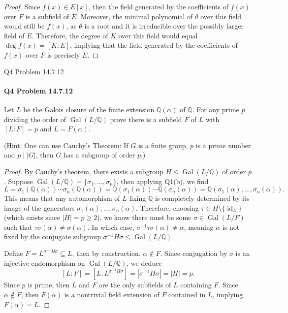 \documentclass[12pt]{article}
\newenvironment{fullbox}{\begin{lrbox}{\savefullbox}\begin{minipage}{\dimexpr\textwidth-2\fboxsep\relax}}{\end{minipage}\end{lrbox}\begin{center}\framebox[\textwidth]{\usebox{\savefullbox}}\end{center}}
\newenvironment{pbox}[1][]{\begin{fullbox}\ifx#1\empty\else\paragraph{#1}\fi}{\end{fullbox}}
\newcommand{\Q}{\mathbb{Q}}
\newcommand{\<}{\langle}
\renewcommand{\>}{\rangle}
\DeclareMathOperator{\id}{id}
\DeclareMathOperator{\Gal}{Gal}
\begin{document}
\begin{proof}
    Since $f(x) \in E[x]$, then the field generated by the coefficients of $f(x)$ over $F$ is a subfield of $E$. Moreover, the minimal polynomial of $\theta$ over this field would still be $f(x)$, as $\theta$ is a root and it is irreducible over the possibly larger field of $E$. Therefore, the degree of $K$ over this field would equal $\deg f(x) = [K : E]$, implying that the field generated by the coefficients of $f(x)$ over $F$ is precisely $E$.

\end{proof}

\newpage
\begin{pbox}[Q4 Problem 14.7.12]
    Let $L$ be the Galois closure of the finite extension $\Q(\alpha)$ of $\Q$. For any prime $p$ dividing the order of $\Gal(L/\Q)$ prove there is a subfield $F$ of $L$ with $[L : F] = p$ and $L = F(\alpha)$.
    
    (Hint: One can use Cauchy's Theorem: If $G$ is a finite group, $p$ is a prime number and $p \mid |G|$, then $G$ has a subgroup of order $p$.)
\end{pbox}

\begin{proof}
    By Cauchy's theorem, there exists a subgroup $H \leq \Gal(L/\Q)$ of order $p$. Suppose $\Gal(L/\Q) = \{\sigma_1, \dots, \sigma_n\}$, then applying Q1(b), we find
    \[
        L
            = \sigma_1(\Q(\alpha)) \cdots \sigma_n(\Q(\alpha))
            = \Q(\sigma_1(\alpha)) \cdots \Q(\sigma_n(\alpha))
            = \Q(\sigma_1(\alpha), \dots, \sigma_n(\alpha)).
    \]
    This means that any automorphism of $L$ fixing $\Q$ is completely determined by its image of the generators $\sigma_1(\alpha), \dots, \sigma_n(\alpha)$. Therefore, choosing $\tau \in H \setminus\{\id_L\}$ (which exists since $|H| = p \geq 2$), we know there must be some $\sigma \in \Gal(L/F)$ such that $\tau\sigma(\alpha) \ne \sigma(\alpha)$. In which case, $\sigma^{-1}\tau\sigma(\alpha) \ne \alpha$, meaning $\alpha$ is not fixed by the conjugate subgroup $\sigma^{-1}H\sigma \leq \Gal(L/\Q)$.
    
    Define $F = L^{\sigma^{-1}H\sigma} \subseteq L$, then by construction, $\alpha \notin F$. Since conjugation by $\sigma$ is an injective endomorphism on $\Gal(L/\Q)$, we deduce
    \[
        [L : F] = [L : L^{\sigma^{-1}H\sigma}] = |\sigma^{-1}H\sigma| = |H| = p.
    \]
    Since $p$ is prime, then $L$ and $F$ are the only subfields of $L$ containing $F$. Since $\alpha \notin F$, then $F(\alpha)$ is a nontrivial field extension of $F$ contained in $L$, implying $F(\alpha) = L$.
    

    

\end{proof}
\end{document}
